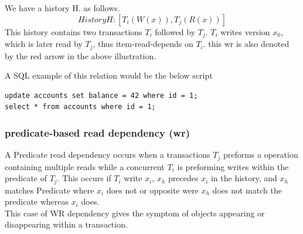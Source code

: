 \documentclass[a4paper,10pt,titlepage]{report}
\begin{document}
We have a history H. as follows.
\begin{equation}
    History H: [T_i(W(x)), T_j(R(x))]
\end{equation}
This history contains two transactions $T_i$ followed by $T_j$. $T_i$ writes version $x_0$, which is later read by $T_j$, thus item-read-depends on $T_i$. this wr is also denoted by the red arrow in the above illustration.
    
A SQL example of this relation would be the below script
        
\begin{lstlisting}
update accounts set balance = 42 where id = 1;
select * from accounts where id = 1;
\end{lstlisting}
        
        

\subsubsection{predicate-based read dependency (wr)}
A Predicate read dependency occurs when a transactions $T_j$ preforms a operation containing multiple reads while a concurrent $T_i$ is preforming writes within the predicate of $T_j$. This occurs if $T_i$ write $x_i$, $x_h$ precedes $x_i$ in the history, and $x_h$ matches Predicate where $x_i$ does not or opposite were $x_h$ does not match the predicate whereas $x_i$ does.\\

This case of WR dependency gives the symptom of objects appearing or disappearing within a transaction. 



\end{document}
